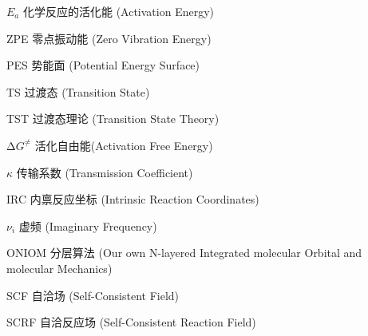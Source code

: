 \begin{denotation}[3cm]
  \item[$E_a$] 化学反应的活化能 (Activation Energy)
  \item[ZPE] 零点振动能 (Zero Vibration Energy)
  \item[PES] 势能面 (Potential Energy Surface)
  \item[TS] 过渡态 (Transition State)
  \item[TST] 过渡态理论 (Transition State Theory)
  \item[$\increment G^\neq$] 活化自由能(Activation Free Energy)
  \item[$\kappa$] 传输系数 (Transmission Coefficient)
  \item[IRC] 内禀反应坐标 (Intrinsic Reaction Coordinates)
  \item[$\nu_i$] 虚频 (Imaginary Frequency)
  \item[ONIOM] 分层算法 (Our own N-layered Integrated molecular Orbital and molecular Mechanics)
  \item[SCF] 自洽场 (Self-Consistent Field)
  \item[SCRF] 自洽反应场 (Self-Consistent Reaction Field)
\end{denotation}





